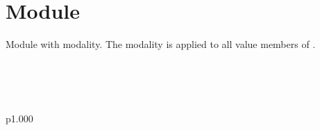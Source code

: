 \section{Module }\label{Oxcaml-M2}%
Module with  modality. The modality is applied to all value members of .

\label{Oxcaml-M2--val-x}\\
\label{Oxcaml-M2--val-f}\\
\label{Oxcaml-M2--type-s}\\
\begin{ocamltabular}{p{1.000\textwidth}}\label{Oxcaml-M2--type-s.a}\\
\end{ocamltabular}%
\\
\ocamlcodefragment{\}}\\


